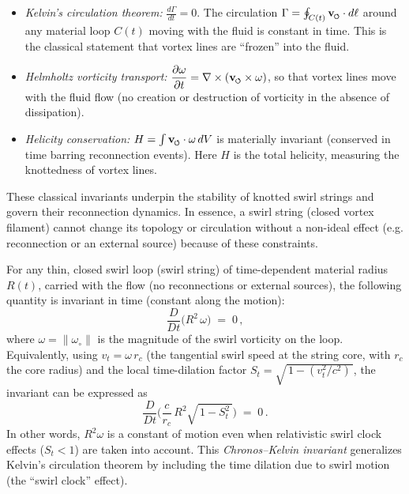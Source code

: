 \documentclass[reprint,aps,onecolumn,nofootinbib]{revtex4-2}
\newcommand{\swirlarrow}{%
    \mathchoice{\mkern-2mu\scriptstyle\boldsymbol{\circlearrowleft}}%
    {\mkern-2mu\scriptstyle\boldsymbol{\circlearrowleft}}%
    {\mkern-2mu\scriptscriptstyle\boldsymbol{\circlearrowleft}}%
    {\mkern-2mu\scriptscriptstyle\boldsymbol{\circlearrowleft}}%
}
\newcommand{\vswirl}{\mathbf{v}_{\swirlarrow}}
\begin{document}
	\begin{itemize}
		\item \emph{Kelvin’s circulation theorem:} $\displaystyle \frac{d\Gamma}{dt} = 0$. The circulation $\Gamma = \oint_{C(t)} \vswirl \cdot d\ell$ around any material loop $C(t)$ moving with the fluid is constant in time. This is the classical statement that vortex lines are “frozen” into the fluid.
		\item \emph{Helmholtz vorticity transport:} $\displaystyle \frac{\partial \omega}{\partial t} = \nabla \times (\vswirl \times \omega)$, so that vortex lines move with the fluid flow (no creation or destruction of vorticity in the absence of dissipation).
		\item \emph{Helicity conservation:} $H = \int \vswirl \cdot \omega\, dV$ is materially invariant (conserved in time barring reconnection events). Here $H$ is the total helicity, measuring the knottedness of vortex lines.
	\end{itemize}

	These classical invariants underpin the stability of knotted swirl strings and govern their reconnection dynamics. In essence, a swirl string (closed vortex filament) cannot change its topology or circulation without a non-ideal effect (e.g. reconnection or an external source) because of these constraints.

	\begin{tcolorbox}[title=Axiom 1: Chronos–Kelvin Invariant]
		For any thin, closed swirl loop (swirl string) of time-dependent material radius $R(t)$, carried with the flow (no reconnections or external sources), the following quantity is invariant in time (constant along the motion):
		\[
			\frac{D}{Dt}\!\Big( R^2\,\omega \Big) \;=\; 0\,,
		\]
		where $\omega = \|\omega_{\circ}\|$ is the magnitude of the swirl vorticity on the loop. Equivalently, using $v_t = \omega\,r_c$ (the tangential swirl speed at the string core, with $r_c$ the core radius) and the local time-dilation factor $S_t = \sqrt{\,1 - (v_t^2/c^2)\,}$, the invariant can be expressed as
		\[
			\frac{D}{Dt}\!\Big( \frac{c}{r_c}\,R^2 \sqrt{\,1 - S_t^2\,}\Big) \;=\; 0\,.
		\]
		In other words, $R^2 \omega$ is a constant of motion even when relativistic swirl clock effects ($S_t<1$) are taken into account. This \emph{Chronos–Kelvin invariant} generalizes Kelvin’s circulation theorem by including the time dilation due to swirl motion (the “swirl clock” effect).
	\end{tcolorbox}
\end{document}

